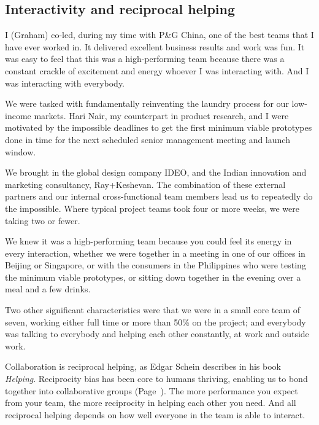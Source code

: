 \subsection{Interactivity and reciprocal helping}
\label{section:reciprocal-helping}
\label{section:interactivity}


\begin{longstoryblock}
I (Graham) co-led, during my time with P\&G China,  one of the best teams that I have ever worked in. It delivered excellent business results and work was fun. It was easy to feel that this was a high-performing team because there was a constant crackle of excitement and energy whoever I was interacting with. And I was interacting with everybody.


We were tasked with fundamentally reinventing the laundry process for our low-income markets. Hari Nair, my counterpart in product research, and I were motivated by the impossible deadlines to get the first minimum viable prototypes done in time for the next scheduled senior management meeting and launch window.


We brought in the global design company IDEO, and the Indian innovation and marketing consultancy, Ray+Ke\-she\-van. The combination of these external partners and our internal cross-functional team members lead us to repeatedly do the impossible. Where typical project teams took four or more weeks, we were taking two or fewer.


We knew it was a high-performing team because you could feel its energy in every interaction, whether we were together in a meeting in one of our offices in Beijing or Singapore, or with the consumers in the Philippines who were testing the minimum viable prototypes, or sitting down together in the evening over a meal and a few drinks. 


Two other significant characteristics were that we were in a small core team of seven, working either full time or more than 50\% on the project; and everybody was talking to everybody and helping each other constantly, at work and outside work. 
\end{longstoryblock}


Collaboration is reciprocal helping, as Edgar Schein describes in his book \emph{Helping}\cite{schein-helping}. Reciprocity bias  has been core to humans thriving, enabling us to bond together into collaborative groups (Page~\pageref{section:reciprocity-bias}). The more performance you expect from your team, the more reciprocity in helping each other you need. And all reciprocal helping depends on how well everyone in the team is able to interact.


